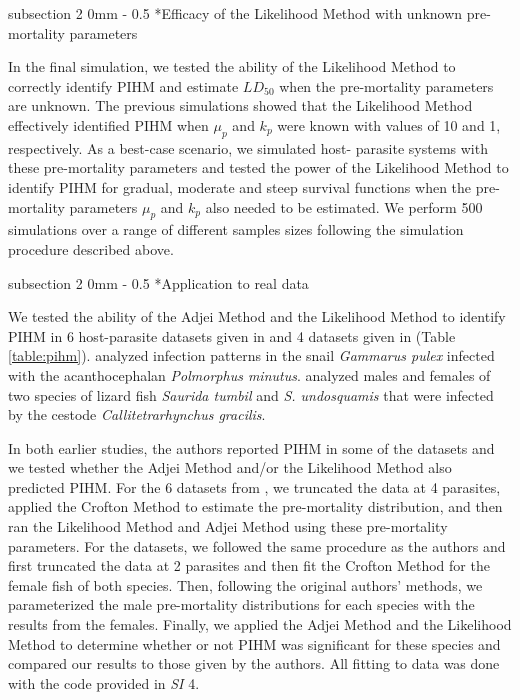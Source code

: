 \documentclass[12pt, a4paper]{article}
\makeatletter
\renewcommand{\subsection}{\@startsection
{subsection}%
{2}%
{0mm}%
{-\baselineskip}%
{0.5\baselineskip}%
{\normalfont\bf}} %
\makeatother
\begin{document}
\subsection*{Efficacy of the Likelihood Method with unknown pre-mortality parameters}

In the final simulation, we tested the ability of the Likelihood Method to
correctly identify PIHM and estimate $LD_{50}$ when the pre-mortality
parameters are unknown. The previous simulations showed that the Likelihood
Method effectively identified PIHM when $\mu_p$ and $k_p$ were known with
values of 10 and 1, respectively.  As a best-case scenario, we simulated host-
parasite systems with these pre-mortality parameters and tested the power of
the Likelihood Method to identify PIHM for gradual, moderate and steep survival
functions when the pre-mortality parameters $\mu_p$ and $k_p$ also needed to be estimated.  We
perform 500 simulations over a range of different samples sizes following the
simulation procedure described above.

\subsection*{Application to real data}

We tested the ability of the Adjei Method and the Likelihood Method to identify
PIHM in 6 host-parasite datasets given in \cite{Crofton1971a} and 4 datasets
given in \cite{Adjei1986} (Table \ref{table:pihm}). \citeauthor{Crofton1971a} analyzed infection patterns in the snail \emph{Gammarus pulex} infected with the
acanthocephalan \emph{Polmorphus minutus}. \citeauthor{Adjei1986} analyzed males and females of two species of lizard fish \emph{Saurida tumbil} and
\emph{S. undosquamis} that were infected by the cestode
\emph{Callitetrarhynchus gracilis}.

In both earlier studies, the authors reported PIHM in some of the datasets and we tested whether the Adjei
Method and/or the Likelihood Method also predicted PIHM. For the 6 datasets from
\cite{Crofton1971a}, we truncated the data at 4 parasites, applied the Crofton
Method to estimate the pre-mortality distribution, and then ran the Likelihood
Method and Adjei Method using these pre-mortality parameters.  For the
\cite{Adjei1986} datasets, we followed the same procedure as the authors and
first truncated the data at 2 parasites and then fit the Crofton Method for the
female fish of both species.  Then, following the original authors' methods, we parameterized the male pre-mortality
distributions for each species with the results from the females.  Finally, we
applied the Adjei Method and the Likelihood Method to determine whether or not
PIHM was significant for these species and compared our results to those given by the authors.  All fitting to data was done with the code provided in \emph{SI} 4.
\end{document}
